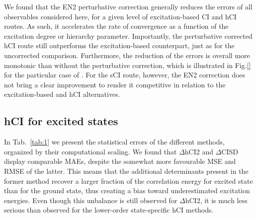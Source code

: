 \documentclass[aip,jcp,reprint,noshowkeys,superscriptaddress]{revtex4-1}
\begin{document}
We found that the EN2 perturbative correction generally reduces the errors of all observables considered here, for a given level of excitation-based CI and hCI routes.
As such, it accelerates the rate of convergence as a function of the excitation degree or hierarchy parameter.
Importantly, the perturbative corrected hCI route still outperforms the excitation-based counterpart, just as for the uncorrected comparison.
Furthermore, the reduction of the errors is overall more monotonic than without the perturbative correction,
which is illustrated in Fig.\ref{} for the particular case of .
For the sCI route, however, the EN2 correction does not bring a clear improvement to render it competitive in relation to the excitation-based and hCI alternatives.


 


\subsection{hCI for excited states}
\label{sec:res_B}

In Tab.~\ref{tab:1} we present the statistical errors of the different methods, organized by their computational scaling.
We found that $\Delta$hCI2 and $\Delta$CISD display comparable MAEs, despite the somewhat more favourable MSE and RMSE of the latter.
This means that the additional determinants present in the former method recover a larger fraction of the correlation energy for excited state than for the ground state,
thus creating a bias toward underestimated excitation energies.
Even though this unbalance is still observed for $\Delta$hCI2, it is much less serious than observed for the lower-order state-specific hCI methods.
\end{document}
